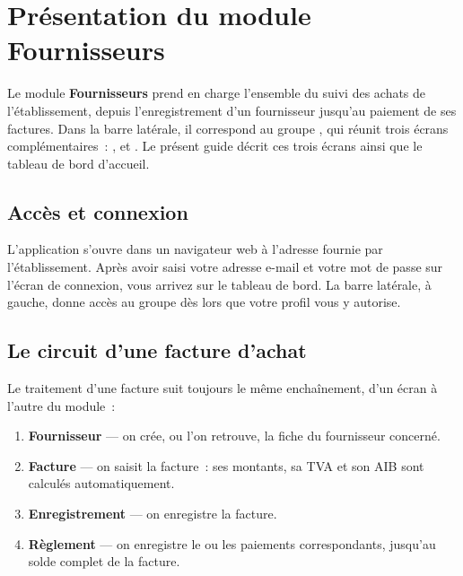 \chapter{Présentation du module Fournisseurs}

Le module \textbf{Fournisseurs} prend en charge l'ensemble du suivi des achats de l'établissement, depuis l'enregistrement d'un fournisseur jusqu'au paiement de ses factures. Dans la barre latérale, il correspond au groupe , qui réunit trois écrans complémentaires~: ,  et . Le présent guide décrit ces trois écrans ainsi que le tableau de bord d'accueil.

\section{Accès et connexion}
L'application s'ouvre dans un navigateur web à l'adresse fournie par l'établissement. Après avoir saisi votre adresse e-mail et votre mot de passe sur l'écran de connexion, vous arrivez sur le tableau de bord. La barre latérale, à gauche, donne accès au groupe  dès lors que votre profil vous y autorise.

\section{Le circuit d'une facture d'achat}
Le traitement d'une facture suit toujours le même enchaînement, d'un écran à l'autre du module~:

\begin{enumerate}
  \item \textbf{Fournisseur} --- on crée, ou l'on retrouve, la fiche du fournisseur concerné.
  \item \textbf{Facture} --- on saisit la facture~: ses montants, sa TVA et son AIB sont calculés automatiquement.
  \item \textbf{Enregistrement} --- on enregistre la facture.
  \item \textbf{Règlement} --- on enregistre le ou les paiements correspondants, jusqu'au solde complet de la facture.
\end{enumerate}

